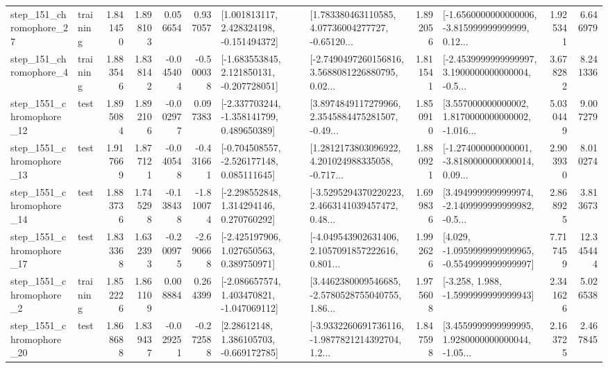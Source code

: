 \begin{tabular}{llrrrrllrlrr}
  step\_151\_chromophore\_27 &  training &      1.841450 &    1.898103 &      0.056654 &  0.937057 &    [1.001813117, 2.428324198, -0.151494372] &  [1.783380463110585, 4.07736004277727, -0.65120... &       1.892056 &  [-1.6560000000000006, -3.815999999999999, 0.12... &            1.925341 &          6.646979 \\
   step\_151\_chromophore\_4 &  training &      1.883546 &    1.838142 &     -0.045404 & -0.500038 &   [-1.683553845, 2.121850131, -0.207728051] &  [-2.7490497260156816, 3.5688081226880795, 0.02... &       1.811541 &  [-2.4539999999999997, 3.1900000000000004, -0.5... &            3.678282 &          8.241336 \\
 step\_1551\_chromophore\_12 &      test &      1.895084 &    1.892106 &     -0.002977 &  0.097383 &   [-2.337703244, -1.358141799, 0.489650389] &  [3.8974849117279966, 2.3545884475281507, -0.49... &       1.850910 &  [3.557000000000002, 1.8170000000000002, -1.016... &            5.030449 &          9.007279 \\
 step\_1551\_chromophore\_13 &      test &      1.917669 &    1.877121 &     -0.040548 & -0.431661 &   [-0.704508557, -2.526177148, 0.085111645] &  [1.2812173803096922, 4.201024988335058, -0.717... &       1.880921 &  [-1.274000000000001, -3.8180000000000014, 0.09... &            2.903930 &          8.010274 \\
 step\_1551\_chromophore\_14 &      test &      1.883736 &    1.745298 &     -0.138438 & -1.810074 &    [-2.298552848, 1.314294146, 0.270760292] &  [-3.5295294370220223, 2.4663141039457472, 0.48... &       1.699836 &  [3.4949999999999974, -2.1409999999999982, -0.5... &            2.868925 &          3.813673 \\
 step\_1551\_chromophore\_17 &      test &      1.833368 &    1.632393 &     -0.200975 & -2.690668 &    [-2.425197906, 1.027650563, 0.389750971] &  [-4.049543902631406, 2.1057091857222616, 0.801... &       1.992626 &  [4.029, -1.0959999999999965, -0.5549999999999997] &            7.717459 &         12.345444 \\
  step\_1551\_chromophore\_2 &  training &      1.852226 &    1.861109 &      0.008884 &  0.264399 &   [-2.086657574, 1.403470821, -1.047069112] &  [3.4462380009546685, -2.5780528755040755, 1.86... &       1.975608 &               [-3.258, 1.988, -1.5999999999999943] &            2.341626 &          5.026538 \\
 step\_1551\_chromophore\_20 &      test &      1.868688 &    1.839437 &     -0.029251 & -0.272588 &     [2.28612148, 1.386105703, -0.669172785] &  [-3.9332260691736116, -1.9877821214392704, 1.2... &       1.847598 &  [3.4559999999999995, 1.9280000000000044, -1.05... &            2.163725 &          2.467845 \\

\end{tabular}
